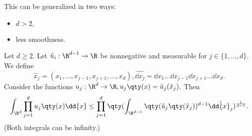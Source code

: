 This can be generalized in two ways: 
\begin{itemize}
	\item $d > 2,$
	\item less smoothness.
\end{itemize}

\begin{lemma}[Gagliardo]
	Let $d\geq 2$. Let $\hat{u}_i:\R^{d-1} \to \R$ be nonnegative and measurable for $j \in \{1,\dots,d\}.$ We define
	\[
		\hat{x}_j = (x_1, \dots, x_{j-1}, x_{j+1}, \dots, x_d), \hat{\dd{x}_j} = \dd{x}_1 \dots \dd{x}_{j-1} \dd{x}_{j+1} \dots \dd{x}_d.
	\]
	Consider the functions $u_j:\R^d \to \R, u_j\qty(x)=\hat{u}_j(\hat{x}_j).$ Then
	\begin{equation}
		\int_{\R^d}\prod_{j=1}^d u_j\qty(x)\dd{x} \leq \prod_{j=1}^d \qty(\int_{\R^{d-1}}\qty(\hat{u}_j\qty(\hat{x}_j))^{d-1}\hat{\dd{x}_j})^{\frac{1}{d-1}}.
	\end{equation}
	(Both integrals can be infinity.)
\end{lemma}

